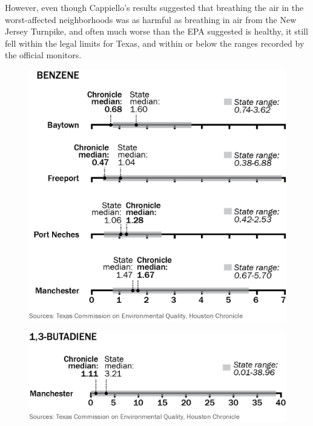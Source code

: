 However, even though Cappiello’s results suggested that breathing the air in
the worst-affected neighborhoods was as harmful as breathing in air from
the New Jersey Turnpike, and often much worse than the EPA suggested is
healthy, it still fell within the legal limits for Texas, and within or below the
ranges recorded by the official monitors.

    \begin{figure}
    \includegraphics{images/HoustonChronicleBenzene.png}
    \end{figure}
    \begin{figure}
    \includegraphics{images/HoustonChronicleButadiene.png}
    \end{figure}
